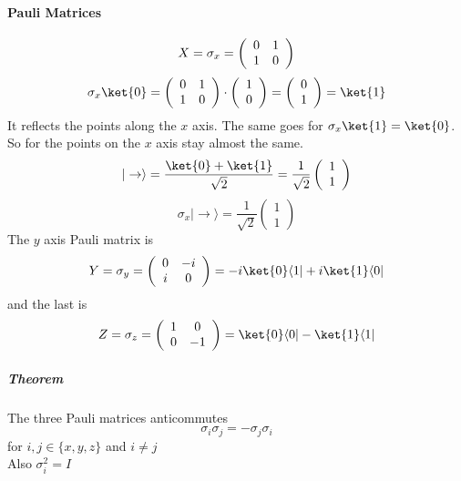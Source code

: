 \documentclass[10pt]{report}
\begin{document}
\paragraph{Pauli Matrices} $$X = \sigma_x = \left(\begin{array}{c c}
0&1\\1&0
\end{array}\right)$$
$$\sigma_x\ket{0} = \left(\begin{array}{c c}
0&1\\1&0
\end{array}\right)\cdot\left(\begin{array}{c}
1\\0
\end{array}\right) = \left(\begin{array}{c}
0\\1
\end{array}\right) =\ket{1}$$
It reflects the points along the $x$ axis. The same goes for $\sigma_x\ket{1} = \ket{0}$.\\
So for the points on the $x$ axis stay almost the same.
$$|\rightarrow\rangle = \frac{\ket{0} + \ket{1}}{\sqrt{2}} = \frac{1}{\sqrt{2}}\left(\begin{array}{c}
1\\1
\end{array}\right)$$
$$\sigma_x|\rightarrow\rangle = \frac{1}{\sqrt{2}}\left(\begin{array}{c}
1\\1
\end{array}\right)$$
The $y$ axis Pauli matrix is $$Y = \sigma_y = \left(\begin{array}{c c}
0&-i\\i&0
\end{array}\right) = -i\ket{0}\langle1| + i \ket{1}\langle0|$$
and the last is $$Z = \sigma_z = \left(\begin{array}{c c}
1&0\\0&-1
\end{array}\right) = \ket{0}\langle0| - \ket{1}\langle1|$$
\subparagraph{Theorem} The three Pauli matrices anticommutes
$$\sigma_i\sigma_j = -\sigma_j\sigma_i$$
for $i,j\in\{x,y,z\}$ and $i\neq j$\\
Also $\sigma_i^2 = I$
\end{document}
